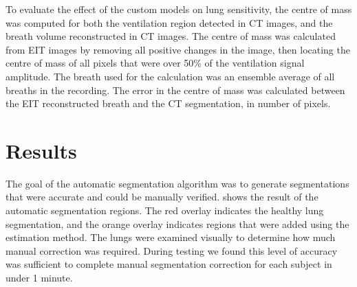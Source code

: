 To evaluate the effect of the custom models on lung sensitivity,
the centre of mass was computed for both the ventilation region detected in 
CT images, and the breath volume reconstructed in CT images. 
The centre of mass was calculated from EIT images by removing all 
positive changes in the image, then locating the centre of mass 
of all pixels that were over 50\% of the ventilation signal amplitude. 
The breath used for the calculation was an ensemble average
of all breaths in the recording.
The error in the centre of mass was calculated between the EIT reconstructed breath 
and the CT segmentation, in number of pixels.

%

\section{Results}

The goal of the automatic segmentation algorithm was to 
generate segmentations that were accurate and could be 
manually verified. 
shows the result of the automatic segmentation regions.
The red overlay indicates the healthy lung segmentation,
and the orange overlay indicates regions that were added
using the estimation method. 
The lungs were examined visually to determine 
how much manual correction was required. During testing
we found this level of accuracy was sufficient to 
complete manual segmentation correction for each subject in 
under 1 minute.

